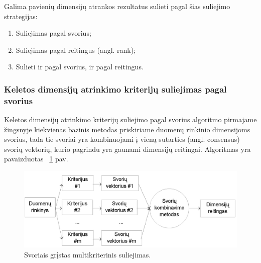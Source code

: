 Galima pavienių dimensijų atrankos rezultatus sulieti pagal šias suliejimo
strategijas:
\begin{enumerate}
  \item Suliejimas pagal svorius;
  \item Suliejimas pagal reitingus (angl. rank);
  \item Sulieti ir pagal svorius, ir pagal reitingus.
\end{enumerate}

\subsubsection{Keletos dimensijų atrinkimo kriterijų suliejimas pagal svorius}

Keletos dimensijų atrinkimo kriterijų suliejimo pagal svorius algoritmo
pirmajame žingsnyje kiekvienas bazinis metodas priskiriame duomenų rinkinio
dimensijoms svorius, tada tie svoriai yra kombinuojami į vieną sutarties
(angl. consensus) svorių vektorių, kurio pagrindu yra gaunami dimensijų 
reitingai. Algoritmas yra pavaizduotas ~\ref{fig:figure4} pav.
\begin{figure}
 \centering
 \includegraphics[width=1\textwidth]{images/score_based_multicriterion_fusion_2.png}
 \caption{Svoriais grįstas multikriterinis suliejimas.}
 \label{fig:figure4}
\end{figure}
